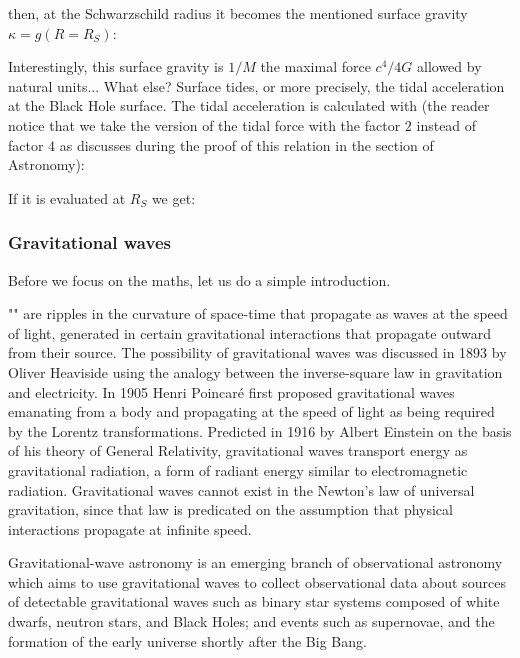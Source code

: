 	then, at the Schwarzschild radius it becomes the mentioned surface gravity $\kappa=g(R=R_S)$:
	
	Interestingly, this surface gravity is $1/M$ the maximal force $c^4/4G$ allowed by natural units... What else? Surface tides, or more precisely, the tidal acceleration at the Black Hole surface. The tidal acceleration is calculated with (the reader notice that we take the version of the tidal force with the factor $2$ instead of factor $4$ as discusses during the proof of this relation in the section of Astronomy):
	
	If it is evaluated at $R_S$ we get:
	
	
	\pagebreak
	\subsubsection{Gravitational waves}
	Before we focus on the maths, let us do a simple introduction.
	
	"" are ripples in the curvature of space-time that propagate as waves at the speed of light, generated in certain gravitational interactions that propagate outward from their source. The possibility of gravitational waves was discussed in 1893 by Oliver Heaviside using the analogy between the inverse-square law in gravitation and electricity. In 1905 Henri Poincaré first proposed gravitational waves emanating from a body and propagating at the speed of light as being required by the Lorentz transformations. Predicted in 1916 by Albert Einstein on the basis of his theory of General Relativity, gravitational waves transport energy as gravitational radiation, a form of radiant energy similar to electromagnetic radiation. Gravitational waves cannot exist in the Newton's law of universal gravitation, since that law is predicated on the assumption that physical interactions propagate at infinite speed.
	
	Gravitational-wave astronomy is an emerging branch of observational astronomy which aims to use gravitational waves to collect observational data about sources of detectable gravitational waves such as binary star systems composed of white dwarfs, neutron stars, and Black Holes; and events such as supernovae, and the formation of the early universe shortly after the Big Bang.
	
